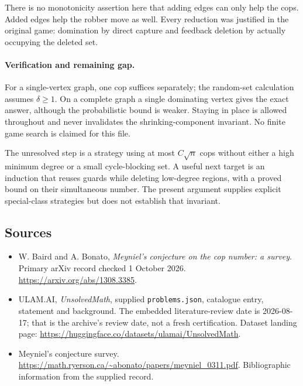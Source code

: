 \documentclass[11pt,a4paper]{article}
\begin{document}
There is no monotonicity assertion here that adding edges can only help the cops. Added edges help the robber move as well. Every reduction was justified in the original game: domination by direct capture and feedback deletion by actually occupying the deleted set.

\paragraph{Verification and remaining gap.}
For a single-vertex graph, one cop suffices separately; the random-set calculation assumes $\delta\ge1$. On a complete graph a single dominating vertex gives the exact answer, although the probabilistic bound is weaker. Staying in place is allowed throughout and never invalidates the shrinking-component invariant. No finite game search is claimed for this file.

The unresolved step is a strategy using at most $C\sqrt n$ cops without either a high minimum degree or a small cycle-blocking set. A useful next target is an induction that reuses guards while deleting low-degree regions, with a proved bound on their simultaneous number. The present argument supplies explicit special-class strategies but does not establish that invariant.

\subsection{Sources}

{\small

\begin{itemize}
\item[E1] W. Baird and A. Bonato, \emph{Meyniel's conjecture on the cop number: a survey}. Primary arXiv record checked 1 October 2026. \url{https://arxiv.org/abs/1308.3385}.


\item[\hypertarget{source:statement:1}{S1}] ULAM.AI, \emph{UnsolvedMath}, supplied \texttt{problems.json}, catalogue entry, statement and background. The embedded literature-review date is 2026-08-17; that is the archive’s review date, not a fresh certification. Dataset landing page: \url{https://huggingface.co/datasets/ulamai/UnsolvedMath}.

\item[\hypertarget{source:statement:2}{S2}] Meyniel's conjecture survey. \url{https://math.ryerson.ca/~abonato/papers/meyniel_0311.pdf}. Bibliographic information from the supplied record.

\end{itemize}

}

\label{end:statement}
\end{document}
